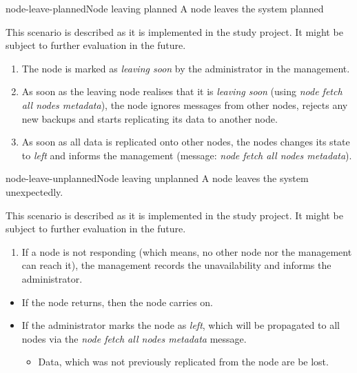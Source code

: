 \begin{scenario}{node-leave-planned}{Node leaving planned}
    A node leaves the system planned
    
   	This scenario is described as it is implemented in the study project. It might be subject to further evaluation in the future.
    
    \begin{enumerate}
    	\item The node is marked as \emph{leaving soon} by the administrator in the management.
		\item As soon as the leaving node realises that it is \emph{leaving soon} (using \emph{node fetch all nodes metadata}), the node ignores messages from other nodes, rejects any new backups and starts replicating its data to another node.
		\item As soon as all data is replicated onto other nodes, the nodes changes its state to \emph{left} and informs the management (message: \emph{node fetch all nodes metadata}). %
    \end{enumerate}
\end{scenario}

\begin{scenario}{node-leave-unplanned}{Node leaving unplanned}
    A node leaves the system unexpectedly.
    
	This scenario is described as it is implemented in the study project. It might be subject to further evaluation in the future.

	\begin{enumerate}
		\item If a node is not responding (which means, no other node nor the management can reach it), the management records the unavailability and informs the administrator.
	\end{enumerate}
	
	\begin{itemize}
		\item If the node returns, then the node carries on.
		\item If the administrator marks the node as \emph{left}, which will be propagated to all nodes via the \emph{node fetch all nodes metadata} message.
			\begin{itemize}
				\item Data, which was not previously replicated from the node are be lost.
			\end{itemize}
	\end{itemize}
\end{scenario}


